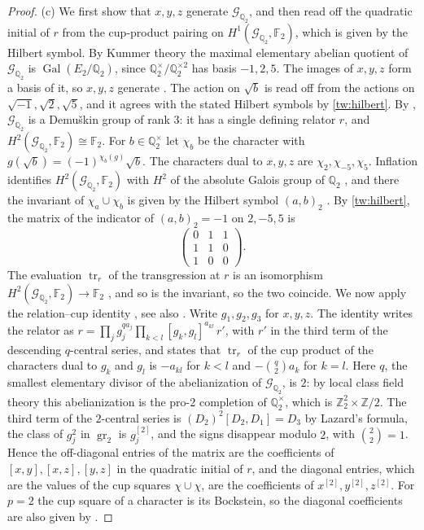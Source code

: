 \documentclass[11pt]{amsart}
\numberwithin{equation}{section}
\theoremstyle{definition}
\theoremstyle{remark}
\DeclareMathOperator{\Gal}{Gal}
\newcommand{\Ftwo}{\mathbb F_2}
\newcommand{\Q}{\mathbb Q}
\newcommand{\Z}{\mathbb Z}
\begin{document}
\begin{proof}
(c) We first show that $x,y,z$ generate $\mathcal G_{\Q_2}$, and then read
off the quadratic initial of $r$ from the cup-product pairing on
$H^1(\mathcal G_{\Q_2},\Ftwo)$, which is given by the Hilbert symbol.
By Kummer theory the maximal elementary abelian quotient of
$\mathcal G_{\Q_2}$ is $\Gal(E_2/\Q_2)$, since $\Q_2^\times/\Q_2^{\times2}$
has basis $-1,2,5$. The images of $x,y,z$ form a basis of it, so $x,y,z$
generate \cite[Proposition~3.9.1]{NeukirchSchmidtWingberg2008}. The action on
$\sqrt b$ is read off from the actions on $\sqrt{-1},\sqrt2,\sqrt5$, and it
agrees with the stated Hilbert symbols by \eqref{tw:hilbert}. By
\cite[Theorem~7.5.11]{NeukirchSchmidtWingberg2008}, $\mathcal G_{\Q_2}$ is a
Demu\v skin group of rank $3$: it has a single defining relator $r$, and
$H^2(\mathcal G_{\Q_2},\Ftwo)\cong\Ftwo$. For $b\in\Q_2^\times$ let $\chi_b$
be the character with $g(\sqrt b)=(-1)^{\chi_b(g)}\sqrt b$. The characters
dual to $x,y,z$ are $\chi_2,\chi_{-5},\chi_5$. Inflation identifies
$H^2(\mathcal G_{\Q_2},\Ftwo)$ with $H^2$ of the absolute Galois group of
$\Q_2$ \cite[Proposition~7.5.8]{NeukirchSchmidtWingberg2008}, and there the
invariant of $\chi_a\cup\chi_b$ is given by the Hilbert symbol $(a,b)_2$
\cite[Chapter~III, Section~4]{MilneCFT}. By \eqref{tw:hilbert}, the matrix of
the indicator of $(a,b)_2=-1$ on $2,-5,5$ is
\[
 \begin{pmatrix}0&1&1\\1&1&0\\1&0&0\end{pmatrix}.
\]
The evaluation $\operatorname{tr}_r$ of the transgression at $r$ is an
isomorphism $H^2(\mathcal G_{\Q_2},\Ftwo)\to\Ftwo$
\cite[Proposition~3.9.12(iii)]{NeukirchSchmidtWingberg2008}, and so is the
invariant, so the two coincide. We now apply the relation--cup identity
\cite[Proposition~3.9.13(ii)]{NeukirchSchmidtWingberg2008}, see also
\cite[Proposition~3.2]{Quadrelli2021}. Write $g_1,g_2,g_3$ for $x,y,z$. The
identity writes the relator as
$r=\prod_jg_j^{qa_j}\prod_{k<l}[g_k,g_l]^{a_{kl}}\,r'$, with $r'$ in the
third term of the descending $q$-central series, and states that
$\operatorname{tr}_r$ of the cup product of the characters dual to $g_k$ and
$g_l$ is $-a_{kl}$ for $k<l$ and $-\binom q2a_k$ for $k=l$. Here $q$, the
smallest elementary divisor of the
abelianization of $\mathcal G_{\Q_2}$, is $2$: by local class field theory
this abelianization is the pro-$2$ completion of $\Q_2^\times$, which is
$\Z_2^2\times\Z/2$. The third term of the $2$-central series is
$(D_2)^2[D_2,D_1]=D_3$ by Lazard's formula, the class of $g_j^2$ in
$\operatorname{gr}_2$ is $g_j^{[2]}$, and the signs disappear modulo $2$,
with $\binom22=1$. Hence the off-diagonal entries of the matrix are the
coefficients of $[x,y],[x,z],[y,z]$ in the quadratic initial of $r$, and the
diagonal entries, which are the values of the cup squares $\chi\cup\chi$,
are the coefficients of $x^{[2]},y^{[2]},z^{[2]}$. For $p=2$ the cup square
of a character is its Bockstein, so the diagonal coefficients are also given
by \cite[Proposition~3.9.14]{NeukirchSchmidtWingberg2008}.
\end{proof}
\end{document}
